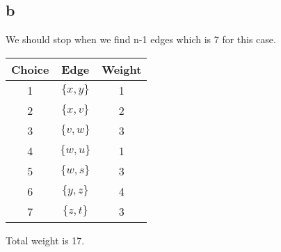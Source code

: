 \documentclass[11pt]{article}
\begin{document}
\subsection*{b}
We should stop when we find n-1 edges which is 7 for this case.
\begin{table}[H]
\small
\centering
\begin{tabular}{|c|c|c|}	%
\hline %
\textbf{Choice} & \textbf{Edge} & \textbf{Weight}  \\
\hline 
1 & $\{ x,y \}$ & 1 \\			%
2 & $\{ x,v \}$ & 2 \\ 
3 & $\{ v,w \}$ & 3\\ 
4 & $\{ w,u \}$ & 1\\ 
5 & $\{ w,s \}$ & 3\\ 
6 & $\{ y,z \}$ & 4\\ 
7 & $\{ z,t \}$ & 3\\ 
\hline 
\end{tabular}
\end{table}
Total weight is 17.
\end{document}
